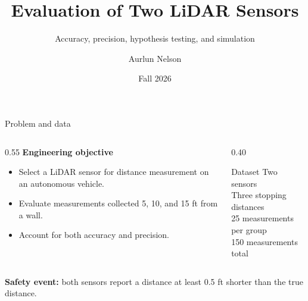 \documentclass[aspectratio=169,14pt]{beamer}
\title{Evaluation of Two LiDAR Sensors}
\subtitle{Accuracy, precision, hypothesis testing, and simulation}
\author{Aurlun Nelson \and \partnername}
\institute{STAT 4714 -- Professor Courtney Kyger}
\date{Fall 2026}
\begin{document}
{%
\begin{frame}[plain]
    \titlepage
\end{frame}
}

\begin{frame}{Problem and data}
    \begin{columns}[T,onlytextwidth]
        \begin{column}{0.55\textwidth}
            \textbf{Engineering objective}
            \begin{itemize}
                \item Select a LiDAR sensor for distance measurement on an autonomous vehicle.
                \item Evaluate measurements collected 5, 10, and 15 ft from a wall.
                \item Account for both accuracy and precision.
            \end{itemize}
        \end{column}
        \begin{column}{0.40\textwidth}
            \begin{block}{Dataset}
                Two sensors\\[0.15cm]
                Three stopping distances\\[0.15cm]
                25 measurements per group\\[0.15cm]
                150 measurements total
            \end{block}
        \end{column}
    \end{columns}

    \vspace{0.35cm}
    \textbf{Safety event:} both sensors report a distance at least 0.5 ft shorter than the true distance.
\end{frame}
\end{document}
